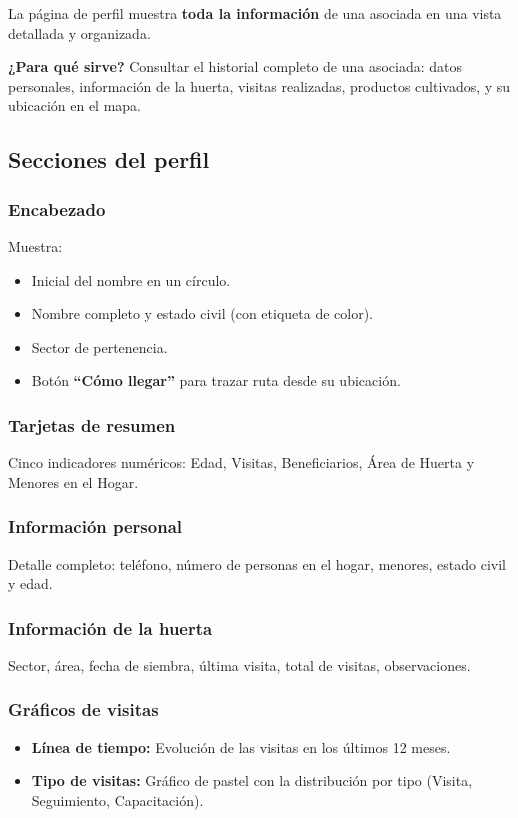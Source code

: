 \documentclass[12pt]{article}
\begin{document}
La página de perfil muestra \textbf{toda la información} de una asociada en una vista detallada y organizada.

\begin{infobox}
  \textbf{¿Para qué sirve?} Consultar el historial completo de una asociada: datos personales, información de la huerta, visitas realizadas, productos cultivados, y su ubicación en el mapa.
\end{infobox}

\subsection{Secciones del perfil}

\subsubsection{Encabezado}
Muestra:
\begin{itemize}[nosep]
  \item Inicial del nombre en un círculo.
  \item Nombre completo y estado civil (con etiqueta de color).
  \item Sector de pertenencia.
  \item Botón \textbf{``Cómo llegar''} para trazar ruta desde su ubicación.
\end{itemize}

\subsubsection{Tarjetas de resumen}
Cinco indicadores numéricos: Edad, Visitas, Beneficiarios, Área de Huerta y Menores en el Hogar.

\subsubsection{Información personal}
Detalle completo: teléfono, número de personas en el hogar, menores, estado civil y edad.

\subsubsection{Información de la huerta}
Sector, área, fecha de siembra, última visita, total de visitas, observaciones.

\subsubsection{Gráficos de visitas}
\begin{itemize}[nosep]
  \item \textbf{Línea de tiempo:} Evolución de las visitas en los últimos 12 meses.
  \item \textbf{Tipo de visitas:} Gráfico de pastel con la distribución por tipo (Visita, Seguimiento, Capacitación).
\end{itemize}
\end{document}

